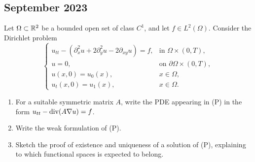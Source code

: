 \subsection{September 2023}
\begin{exercise}
    Let \(\Omega \subset \mathbb{R}^2\) be a bounded open set of class \(C^1\), and let \(f \in L^2(\Omega)\). Consider the Dirichlet problem
    \begin{equation*}
        \begin{cases}
            u_{tt} - \left(\partial_x^2 u + 2 \partial_y^2 u - 2 \partial_{xy} u\right) = f, & \text{in } \Omega \times (0, T), \\
            u = 0, & \text{on } \partial \Omega \times (0, T), \\
            u(x,0) = u_0(x), & x \in \Omega, \\
            u_t(x,0) = u_1(x), & x \in \Omega.
        \end{cases}
        \tag{(P)}
    \end{equation*}
    \begin{enumerate}
        \item For a suitable symmetric matrix \(A\), write the PDE appearing in (P) in the form \(u_{tt} - \text{div}(A \nabla u) = f\).
        \item Write the weak formulation of (P).
        \item Sketch the proof of existence and uniqueness of a solution of (P), explaining to which functional spaces is expected to belong.
    \end{enumerate}
\end{exercise}
